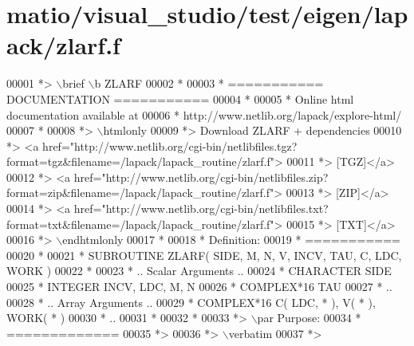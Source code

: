 \hypertarget{matio_2visual__studio_2test_2eigen_2lapack_2zlarf_8f_source}{}\section{matio/visual\+\_\+studio/test/eigen/lapack/zlarf.f}
\label{matio_2visual__studio_2test_2eigen_2lapack_2zlarf_8f_source}

\begin{DoxyCode}
00001 \textcolor{comment}{*> \(\backslash\)brief \(\backslash\)b ZLARF}
00002 \textcolor{comment}{*}
00003 \textcolor{comment}{*  =========== DOCUMENTATION ===========}
00004 \textcolor{comment}{*}
00005 \textcolor{comment}{* Online html documentation available at }
00006 \textcolor{comment}{*            http://www.netlib.org/lapack/explore-html/ }
00007 \textcolor{comment}{*}
00008 \textcolor{comment}{*> \(\backslash\)htmlonly}
00009 \textcolor{comment}{*> Download ZLARF + dependencies }
00010 \textcolor{comment}{*> <a
       href="http://www.netlib.org/cgi-bin/netlibfiles.tgz?format=tgz&filename=/lapack/lapack\_routine/zlarf.f"> }
00011 \textcolor{comment}{*> [TGZ]</a> }
00012 \textcolor{comment}{*> <a
       href="http://www.netlib.org/cgi-bin/netlibfiles.zip?format=zip&filename=/lapack/lapack\_routine/zlarf.f"> }
00013 \textcolor{comment}{*> [ZIP]</a> }
00014 \textcolor{comment}{*> <a
       href="http://www.netlib.org/cgi-bin/netlibfiles.txt?format=txt&filename=/lapack/lapack\_routine/zlarf.f"> }
00015 \textcolor{comment}{*> [TXT]</a>}
00016 \textcolor{comment}{*> \(\backslash\)endhtmlonly }
00017 \textcolor{comment}{*}
00018 \textcolor{comment}{*  Definition:}
00019 \textcolor{comment}{*  ===========}
00020 \textcolor{comment}{*}
00021 \textcolor{comment}{*       SUBROUTINE ZLARF( SIDE, M, N, V, INCV, TAU, C, LDC, WORK )}
00022 \textcolor{comment}{* }
00023 \textcolor{comment}{*       .. Scalar Arguments ..}
00024 \textcolor{comment}{*       CHARACTER          SIDE}
00025 \textcolor{comment}{*       INTEGER            INCV, LDC, M, N}
00026 \textcolor{comment}{*       COMPLEX*16         TAU}
00027 \textcolor{comment}{*       ..}
00028 \textcolor{comment}{*       .. Array Arguments ..}
00029 \textcolor{comment}{*       COMPLEX*16         C( LDC, * ), V( * ), WORK( * )}
00030 \textcolor{comment}{*       ..}
00031 \textcolor{comment}{*  }
00032 \textcolor{comment}{*}
00033 \textcolor{comment}{*> \(\backslash\)par Purpose:}
00034 \textcolor{comment}{*  =============}
00035 \textcolor{comment}{*>}
00036 \textcolor{comment}{*> \(\backslash\)verbatim}
00037 \textcolor{comment}{*>}

\end{DoxyCode}
